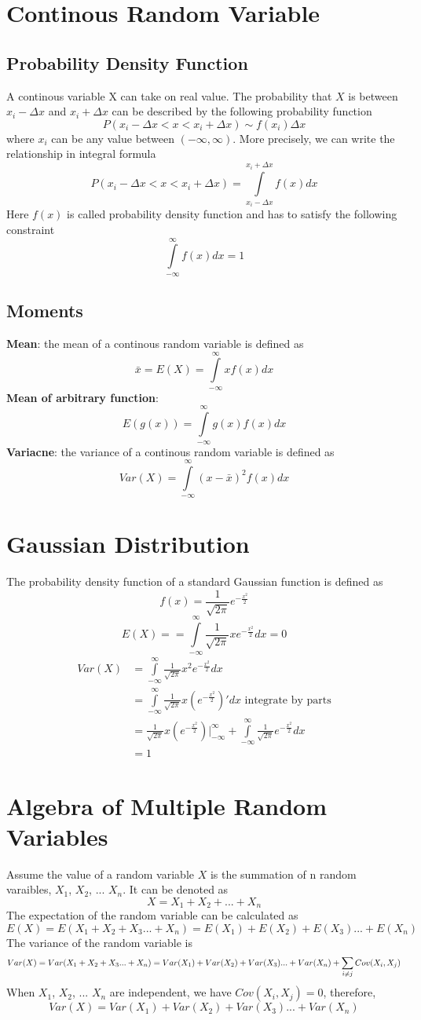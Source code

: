 \documentclass[12pt, oneside]{article}
\begin{document}
\section{Continous Random Variable}
\subsection{Probability Density Function}
A continous variable X can take on real value. The probability that $X$ is between $x_i-\Delta x$ and $x_i+ \Delta x$ can be described by the following probability function
$$P(x_i-\Delta x<x<x_i+\Delta x)\sim f(x_i)\Delta x$$
where $x_i$ can be any value between $(-\infty, \infty)$. More precisely, we can write the relationship in integral formula
$$P(x_i-\Delta x<x<x_i+\Delta x)=\int\limits_{x_i-\Delta x}^{x_i+\Delta x}f(x)dx$$
Here $f(x)$ is called probability density function and has to satisfy the following constraint
$$\int\limits_{-\infty}^{\infty}f(x)dx=1$$
\subsection{Moments}
\textbf{Mean}: the mean of a continous random variable is defined as 
$$\bar{x}=E(X)=\int\limits_{-\infty}^{\infty}xf(x)dx$$
\textbf{Mean of arbitrary function}:
$$E(g(x))=\int\limits_{-\infty}^{\infty}g(x)f(x)dx$$
\textbf{Variacne}: the variance of a continous random variable is defined as 
$$Var(X)=\int\limits_{-\infty}^{\infty}(x-\bar{x})^2f(x)dx$$

\section{Gaussian Distribution}
The probability density function of a standard Gaussian function is defined as 
$$f(x)=\frac{1}{\sqrt{2\pi}}e^{-\frac{x^2}{2}}$$
$$E(X)==\int\limits_{-\infty}^{\infty}\frac{1}{\sqrt{2\pi}}xe^{-\frac{x^2}{2}}dx=0$$
\begin{align*}
Var(X)&=\int\limits_{-\infty}^{\infty}\frac{1}{\sqrt{2\pi}}x^2e^{-\frac{x^2}{2}}dx\\
&=\int\limits_{-\infty}^{\infty}\frac{1}{\sqrt{2\pi}}x(e^{-\frac{x^2}{2}})'dx \text{ integrate by parts}\\
&=\frac{1}{\sqrt{2\pi}}x(e^{-\frac{x^2}{2}})|_{-\infty}^{\infty}+\int\limits_{-\infty}^{\infty}\frac{1}{\sqrt{2\pi}}e^{-\frac{x^2}{2}}dx\\
&=1
\end{align*}

\section{Algebra of Multiple Random Variables}
Assume the value of a random variable $X$ is the summation of n random varaibles, $X_1$, $X_2$, ... $X_n$. It can be denoted as
$$X=X_1+X_2+ ... +X_n$$
The expectation of the random variable can be calculated as 
$$E(X)=E(X_1+X_2+X_3 ... +X_n)=E(X_1)+E(X_2)+E(X_3)...+E(X_n)$$
The variance of the random variable is 
$$Var(X)=Var(X_1+X_2+X_3 ... +X_n)=Var(X_1)+Var(X_2)+Var(X_3)...+Var(X_n)+\sum_{i\neq	j}\mathnormal{Cov}(X_i, X_j)$$
When $X_1$, $X_2$, ... $X_n$ are independent, we have $Cov(X_i, X_j)=0$, therefore,
$$Var(X)=Var(X_1)+Var(X_2)+Var(X_3)...+Var(X_n)$$
\end{document}
